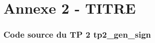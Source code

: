 \chapter*{Annexe 2 - TITRE}
\setcounter{section}{0}
\setcounter{subsection}{0}

\subsection*{Code source du TP 2 \textbf{tp2\_gen\_sign}}

